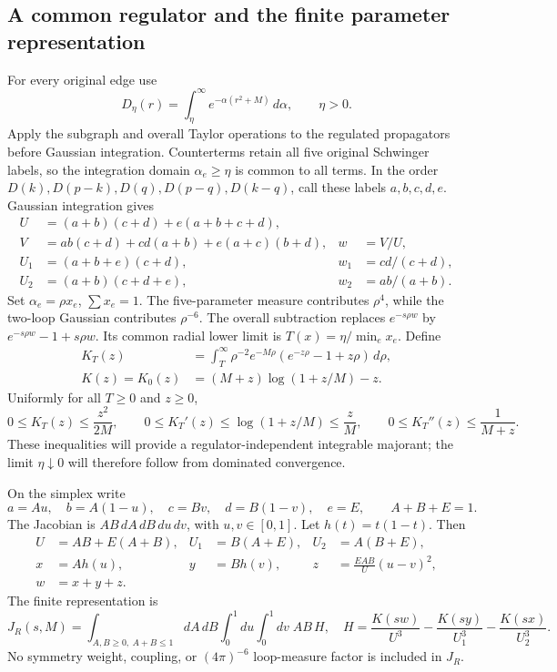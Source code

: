 \subsection{A common regulator and the finite parameter representation}
For every original edge use
\[
 D_\eta(r)=\int_\eta^\infty e^{-\alpha(r^2+M)}\,d\alpha,
 \qquad\eta>0.
\]
Apply the subgraph and overall Taylor operations to the regulated propagators
before Gaussian integration. Counterterms retain all five original Schwinger
labels, so the integration domain \(\alpha_e\geq\eta\) is common to all terms.
In the order \(D(k),D(p-k),D(q),D(p-q),D(k-q)\), call these labels
\(a,b,c,d,e\). Gaussian integration gives
\begin{align}
 U&=(a+b)(c+d)+e(a+b+c+d),\\
 V&=ab(c+d)+cd(a+b)+e(a+c)(b+d),&w&=V/U,\\
 U_1&=(a+b+e)(c+d),&w_1&=cd/(c+d),\\
 U_2&=(a+b)(c+d+e),&w_2&=ab/(a+b).
\end{align}
Set \(\alpha_e=\rho x_e\), \(\sum x_e=1\). The five-parameter measure
contributes \(\rho^4\), while the two-loop Gaussian contributes
\(\rho^{-6}\). The overall subtraction replaces \(e^{-s\rho w}\) by
\(e^{-s\rho w}-1+s\rho w\). Its common radial lower limit is
\(T(x)=\eta/\min_e x_e\). Define
\begin{align}
 K_T(z)&=\int_T^\infty\rho^{-2}e^{-M\rho}
              (e^{-z\rho}-1+z\rho)\,d\rho,\\
 K(z)=K_0(z)&=(M+z)\log(1+z/M)-z.
\end{align}
Uniformly for all \(T\geq0\) and \(z\geq0\),
\begin{equation}\label{eq:kernel-bounds}
 0\leq K_T(z)\leq\frac{z^2}{2M},\qquad
 0\leq K_T'(z)\leq\log(1+z/M)\leq\frac zM,\qquad
 0\leq K_T''(z)\leq\frac1{M+z}.
\end{equation}
These inequalities will provide a regulator-independent integrable majorant;
the limit \(\eta\downarrow0\) will therefore follow from dominated convergence.

On the simplex write
\[
 a=Au,\quad b=A(1-u),\quad c=Bv,\quad d=B(1-v),\quad e=E,
 \qquad A+B+E=1.
\]
The Jacobian is \(AB\,dA\,dB\,du\,dv\), with \(u,v\in[0,1]\). Let
\(h(t)=t(1-t)\). Then
\begin{align}
 U&=AB+E(A+B),& U_1&=B(A+E),& U_2&=A(B+E),\\
 x&=Ah(u),& y&=Bh(v),& z&=\frac{EAB}{U}(u-v)^2,\\
 w&=x+y+z.&&&
\end{align}
The finite representation is
\begin{equation}\label{eq:finite-overlap}
 J_R(s,M)=\int_{A,B\geq0,\ A+B\leq1}\!dA\,dB
       \int_0^1du\int_0^1dv\;AB\,H,
 \quad
 H=\frac{K(sw)}{U^3}-\frac{K(sy)}{U_1^3}-\frac{K(sx)}{U_2^3}.
\end{equation}
No symmetry weight, coupling, or \((4\pi)^{-6}\) loop-measure factor is
included in \(J_R\).

